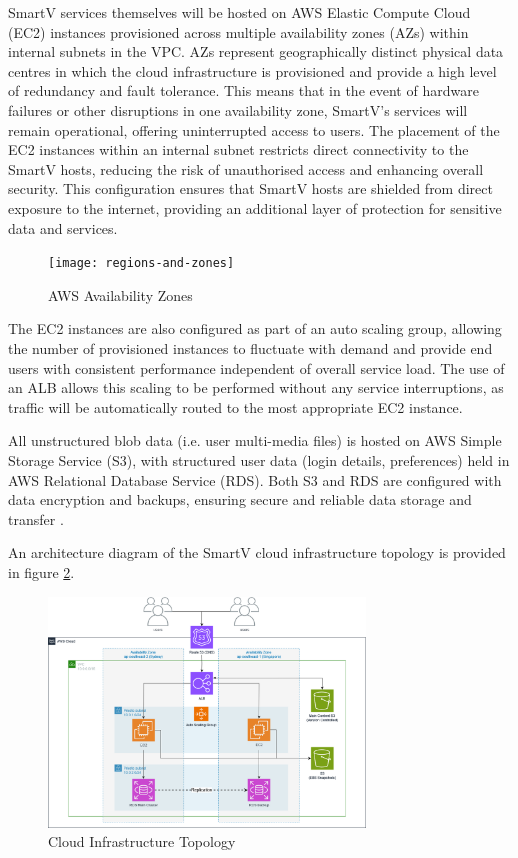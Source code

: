 SmartV services themselves will be hosted on AWS Elastic Compute Cloud (EC2) instances provisioned across multiple availability zones (AZs) within internal subnets in the VPC. AZs represent geographically distinct physical data centres in which the cloud infrastructure is provisioned and provide a high level of redundancy and fault tolerance. This means that in the event of hardware failures or other disruptions in one availability zone, SmartV's services will remain operational, offering uninterrupted access to users. The placement of the EC2 instances within an internal subnet restricts direct connectivity to the SmartV hosts, reducing the risk of unauthorised access and enhancing overall security. This configuration ensures that SmartV hosts are shielded from direct exposure to the internet, providing an additional layer of protection for sensitive data and services.

\begin{figure}[h]
    \centering
    \texttt{[image: regions-and-zones]}
    \caption{AWS Availability Zones \parencite{amazonwebservicesAWSRegionsAvailability}}
    \label{fig:availabilityzones}
\end{figure}

The EC2 instances are also configured as part of an auto scaling group, allowing the number of provisioned instances to fluctuate with demand and provide end users with consistent performance independent of overall service load. The use of an ALB allows this scaling to be performed without any service interruptions, as traffic will be automatically routed to the most appropriate EC2 instance.


All unstructured blob data (i.e. user multi-media files) is hosted on AWS Simple Storage Service (S3), with structured user data (login details, preferences) held in AWS Relational Database Service (RDS). Both S3 and RDS are configured with data encryption and backups, ensuring secure and reliable data storage and transfer \parencite{amazonwebservicesEncryptingAmazonRDS2023, amazonwebservicesProtectingDataEncryption2023}.

An architecture diagram of the SmartV cloud infrastructure topology is provided in figure \ref{fig:awsdiagram}.

\begin{figure}[h]
    \centering
    \includegraphics[width=0.75\textwidth]{cci_aws}
    \caption{Cloud Infrastructure Topology}
    \label{fig:awsdiagram}
\end{figure}


